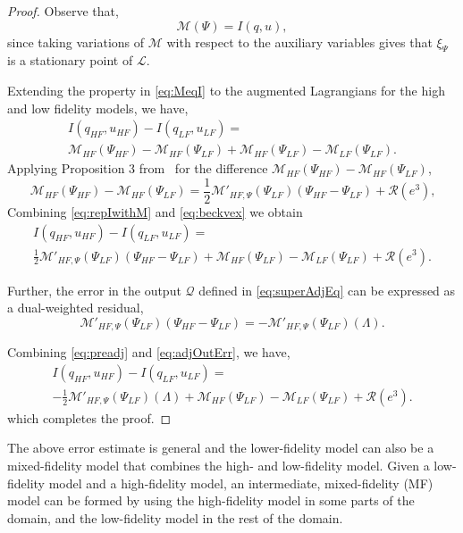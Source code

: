 \begin{proof}
%
Observe that,
%
\begin{equation}
\label{eq:MeqI}
\mathcal{M}(\Psi)=I(q,u),
\end{equation}
%
since taking variations of $\mathcal{M}$ with respect to the auxiliary variables gives that $\xi_\Psi$ is a stationary point of $\mathcal{L}$.

Extending the property in \cref{eq:MeqI} to the augmented Lagrangians for the high and low fidelity models, we have,
%
\begin{multline}
\label{eq:repIwithM}
I(q_{HF},u_{HF})-I(q_{LF},u_{LF})=\\\mathcal{M}_{HF}(\Psi_{HF})-\mathcal{M}_{HF}(\Psi_{LF})+\mathcal{M}_{HF}(\Psi_{LF})-\mathcal{M}_{LF}(\Psi_{LF})\textrm{.}
\end{multline}
%
Applying Proposition 3 from~\cite{BecVex05} for the difference $\mathcal{M}_{HF}(\Psi_{HF})-\mathcal{M}_{HF}(\Psi_{LF})$,
\begin{equation}
\label{eq:beckvex}
\mathcal{M}_{HF}(\Psi_{HF})-\mathcal{M}_{HF}(\Psi_{LF}) = \frac{1}{2}\mathcal{M}'_{HF,\Psi}(\Psi_{LF})(\Psi_{HF}-\Psi_{LF})+\mathcal{R}(e^3)\textrm{,}
\end{equation}
Combining \cref{eq:repIwithM} and \cref{eq:beckvex} we obtain
\begin{multline}
\label{eq:preadj}
I(q_{HF},u_{HF})-I(q_{LF},u_{LF})=\\\frac{1}{2}\mathcal{M}'_{HF,\Psi}(\Psi_{LF})(\Psi_{HF}-\Psi_{LF})+\mathcal{M}_{HF}(\Psi_{LF})-\mathcal{M}_{LF}(\Psi_{LF})+\mathcal{R}(e^3)\textrm{.}
\end{multline}

Further, the error in the output $\mathcal{Q}$ defined in \cref{eq:superAdjEq} can be expressed as a dual-weighted residual,
\begin{equation}
\label{eq:adjOutErr}
\mathcal M'_{HF,\Psi}(\Psi_{LF})(\Psi_{HF}-\Psi_{LF})=-\mathcal{M}'_{HF,\Psi}(\Psi_{LF})(\Lambda).
\end{equation}

Combining \cref{eq:preadj} and \cref{eq:adjOutErr}, we have,
\begin{multline}
I(q_{HF},u_{HF})-I(q_{LF},u_{LF})=\\-\frac{1}{2}\mathcal{M}'_{HF,\Psi}(\Psi_{LF})(\Lambda)+\mathcal M_{HF}(\Psi_{LF})-\mathcal M_{LF}(\Psi_{LF})+\mathcal{R}(e^3). \nonumber
\end{multline}
%
which completes the proof.
\end{proof}
%
The above error estimate is general and the lower-fidelity model can also be a mixed-fidelity model that combines the high- and low-fidelity model. Given a low-fidelity model and a high-fidelity model, an intermediate, mixed-fidelity (MF) model can be formed by using the high-fidelity model in some parts of the domain, and the low-fidelity model in the rest of the domain.
